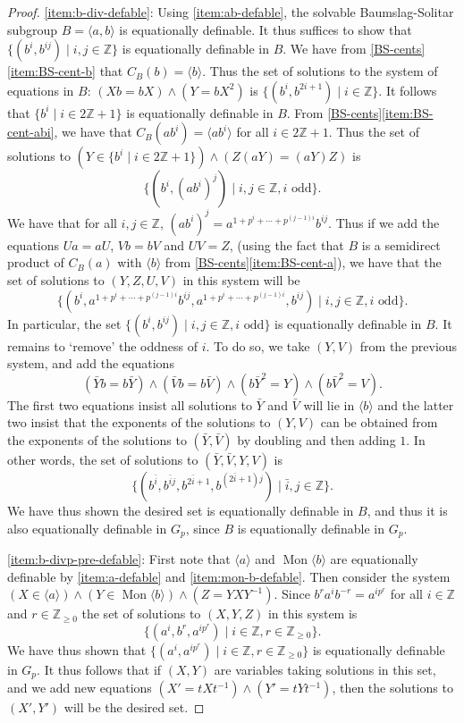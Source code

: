 \documentclass[10pt,a4paper]{amsart}
\DeclareMathOperator{\Mon}{Mon}
\newcommand{\Z}{\mathbb{Z}}
\begin{document}
\begin{proof}
	\eqref{item:b-div-defable}: Using \eqref{item:ab-defable}, the solvable
	Baumslag-Solitar subgroup \(B = \langle a, b \rangle\) is equationally
	definable. It thus suffices to show that \(\{(b^i, b^{ij}) \mid i, j \in
	\Z\}\) is equationally definable in \(B\). We have from \cref{BS-cents}
	\eqref{item:BS-cent-b} that \(C_B(b) = \langle b \rangle\). Thus the
	set of solutions to the system of equations in \(B\): \((Xb = bX) \wedge (Y = bX^2)\) is
	\(\{(b^i, b^{2i + 1}) \mid i \in \Z\}\). It follows that
	\(\{b^i \mid i \in 2 \Z + 1\}\) is equationally definable in \(B\). From
	\cref{BS-cents}\eqref{item:BS-cent-abi}, we have that \(C_B(ab^i) = \langle ab^i
	\rangle\) for all \(i \in 2 \Z + 1\). Thus the set of solutions to
	\((Y \in \{b^i \mid i \in 2\Z + 1\}) \wedge (Z (aY) = (aY)Z)\) is
	\[
		\{(b^i, (ab^i)^j) \mid i, j \in \Z, i \text{ odd}\}.
	\]
	We have that for all \(i, j \in \Z\), \((ab^i)^j = a^{1 + p^i + \cdots +
	p^{(j - 1)i}} b^{ij}\). Thus if we add the equations \(Ua = aU\), \(Vb =
	bV\) and \(UV = Z\), (using the fact that \(B\) is a semidirect product of
	\(C_B(a)\) with \(\langle b \rangle\) from
	\cref{BS-cents}\eqref{item:BS-cent-a}), we have that the set of solutions
	to \((Y, Z, U, V)\) in this system will be
	\[
			\{(b^i, a^{1 + p^i + \cdots + p^{(j - 1)i}} b^{ij},  a^{1 + p^i +
			\cdots + p^{(j - 1)i}}, b^{ij}) \mid i, j \in \Z, i \text{ odd}\}.
	\]
	In particular, the set \(\{(b^i, b^{ij}) \mid i, j \in \Z, i \text{ odd}\}\)
	is equationally definable in \(B\). It remains to `remove' the oddness
	of \(i\). To do so, we take \((Y, V)\) from the previous system, and add
	the equations
	\[
		(\bar{Y} b = b \bar{Y}) \wedge
		(\bar{V} b = b \bar{V}) \wedge
		(b \bar{Y}^2 = Y) \wedge
		(b \bar{V}^2 = V).
	\]
	The first two equations insist all solutions to \(\bar{Y}\) and \(\bar{V}\)
	will lie in \(\langle b \rangle\) and the latter two insist that the exponents of
	the solutions to \((Y, V)\) can be obtained from the exponents of the solutions
	to \((\bar{Y}, \bar{V})\) by doubling and then adding \(1\). In other words,
	the set of solutions to \((\bar{Y}, \bar{V}, Y, V)\) is
	\[
			\{(b^{\bar{i}}, b^{\bar{i} j}, b^{2 \bar{i} + 1},
			b^{(2 \bar i + 1)j}) \mid \bar{i}, j \in \Z\}.
	\]
	We have thus shown the desired set is equationally definable in \(B\), and thus it
	is also equationally definable in \(G_p\), since \(B\) is equationally definable
	in \(G_p\).

	\eqref{item:b-divp-pre-defable}: First note that \(\langle a \rangle\) and
	\(\Mon\langle b \rangle\) are equationally definable by \eqref{item:a-defable}
	and \eqref{item:mon-b-defable}. Then consider the system \((X \in \langle a
	\rangle) \wedge (Y \in \Mon\langle b \rangle) \wedge (Z = YXY^{-1}) \). Since
	\(b^r a^i b^{-r} = a^{ip^r}\) for all \(i \in \Z\) and \(r \in \Z_{\geq 0}\) 
	the set of solutions to \((X, Y, Z)\) in this system is
	\[
			\{(a^i, b^r, a^{ip^r}) \mid i \in \Z, r \in \Z_{\geq 0}\}.
	\]
	We have thus shown that \(\{(a^i, a^{ip^r}) \mid i \in \Z, r \in \Z_{\geq 0}\}\)
	is equationally definable in \(G_p\). It thus follows that if
	\((X, Y)\) are variables taking solutions in this set, and we add new
	equations \((X' = tXt^{-1}) \wedge (Y' = t Y t^{-1})\), then the
	solutions to \((X', Y')\) will be the desired set.


\end{proof}
\end{document}
